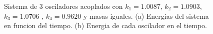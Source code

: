 \documentclass[11pt,letterpaper,twocolumn]{article}
\begin{document}
\begin{figure}[h!]
\begin{center}
\caption{Sistema de 3 osciladores acoplados con $k_{1}=1.0087$, $k_{2}=1.0903$, $k_{3}=1.0706$ , $k_{4}=0.9620$ y masas iguales. (a) Energias del sistema en funcion del tiempo. (b) Energia de cada oscilador en el tiempo.}
\end{center}
\label{ene}
\end{figure}
\par 
\end{document}
